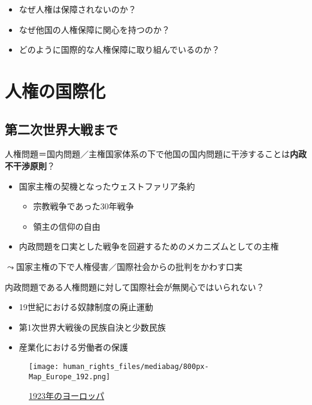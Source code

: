 \documentclass[
  xelatex,
  ja=standard]{bxjsarticle}
\providecommand{\tightlist}{%
  \setlength{\itemsep}{0pt}\setlength{\parskip}{0pt}}\usepackage{longtable,booktabs,array}
\begin{document}
\begin{itemize}
\tightlist
\item
  なぜ人権は保障されないのか？
\item
  なぜ他国の人権保障に関心を持つのか？
\item
  どのように国際的な人権保障に取り組んでいるのか？
\end{itemize}

\hypertarget{ux4ebaux6a29ux306eux56fdux969bux5316}{%
\section{人権の国際化}\label{ux4ebaux6a29ux306eux56fdux969bux5316}}

\hypertarget{ux7b2cux4e8cux6b21ux4e16ux754cux5927ux6226ux307eux3067}{%
\subsection{第二次世界大戦まで}\label{ux7b2cux4e8cux6b21ux4e16ux754cux5927ux6226ux307eux3067}}

人権問題＝国内問題／主権国家体系の下で他国の国内問題に干渉することは\textbf{内政不干渉原則}？

\begin{itemize}
\tightlist
\item
  国家主権の契機となったウェストファリア条約

  \begin{itemize}
  \tightlist
  \item
    宗教戦争であった30年戦争
  \item
    領主の信仰の自由
  \end{itemize}
\item
  内政問題を口実とした戦争を回避するためのメカニズムとしての主権
\end{itemize}

\(\leadsto\)国家主権の下で人権侵害／国際社会からの批判をかわす口実

内政問題である人権問題に対して国際社会が無関心ではいられない？

\begin{itemize}
\tightlist
\item
  19世紀における奴隷制度の廃止運動
\item
  第1次世界大戦後の民族自決と少数民族
\item
  産業化における労働者の保護
\end{itemize}

\begin{figure}[htpb]

{\centering \texttt{[image: human\_rights\_files/mediabag/800px-Map\_Europe\_192.png]}

}

\caption{\href{https://commons.wikimedia.org/wiki/File:Map_Europe_1923-en.svg}{1923年のヨーロッパ}}

\end{figure}
\end{document}
